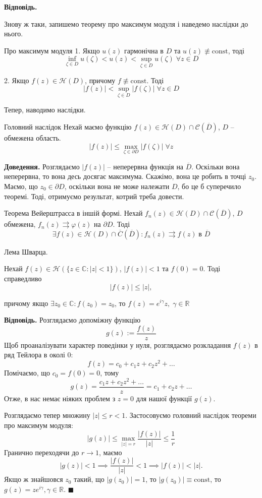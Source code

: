 \documentclass[14pt]{extarticle}
\begin{document}
\textbf{Відповідь.}

Знову ж таки, запишемо теорему про максимум модуля і наведемо наслідки до нього.

\begin{theorem*}{Про максимум модуля}
    1. Якщо $u(z)$ гармонічна в $D$ та $u(z) \not\equiv \text{const}$, тоді
    \[
    \inf_{\zeta \in D} u(\zeta) < u(z) < \sup_{\zeta \in D} u(\zeta) \; \forall z \in D
    \]
    
    2. Якщо $f(z) \in \mathcal{H}(D)$, причому $f \not\equiv \text{const}$. Тоді
    \[
    |f(z)| < \sup_{\zeta \in D}|f(\zeta)| \; \forall z \in D
    \]
\end{theorem*}

Тепер, наводимо наслідки.

\begin{theorem*}{Головний наслідок}
    Нехай маємо функцію $f(z) \in \mathcal{H}(D) \cap \mathcal{C}(\overline{D})$, $D$ -- обмежена область. 
    \[
    |f(z)| \leq \max_{\zeta \in \partial D}|f(\zeta)| \; \forall z
    \]
\end{theorem*}

\textbf{Доведення.} Розглядаємо $|f(z)|$ -- неперервна функція на $\overline{D}$. Оскільки вона неперервна, то вона десь досягає максимума. Скажімо, вона це робить в точці $z_0$. Маємо, що $z_0 \in \partial D$, оскільки вона не може належати $D$, бо це б суперечило теоремі. Тоді, отримуємо результат, котрий треба довести.

\begin{theorem*}{Теорема Вейерштрасса в іншій формі.} 
Нехай $f_n(z) \in \mathcal{H}(D) \cap \mathcal{C}(\overline{D})$, $D$ обмежена, $f_n(z) \rightrightarrows \varphi(z)$ на $\partial D$. Тоді 
\[
\exists f(z) \in \mathcal{H}(D) \cap \overline{C}(\overline{D}): f_n(z) \rightrightarrows f(z) \; \text{в $\overline{D}$}
\]
\end{theorem*}

\begin{lemma*}{Лема Шварца.} 

Нехай $f(z) \in \mathcal{H}(\{z \in \mathbb{C}: |z|<1\})$, $|f(z)| < 1$ та $f(0)=0$. Тоді справедливо
\[
|f(z)| \leq |z|,
\]

причому якщо $\exists z_0 \in \mathbb{C}: f(z_0)=z_0$, то $f(z) =e^{i\gamma}z, \; \gamma \in \mathbb{R}$
\end{lemma*}

\textbf{Відповідь.} Розглядаємо допоміжну функцію
\[
g(z) := \frac{f(z)}{z}
\]
Щоб проаналізувати характер поведінки у нуля, розглядаємо розкладання $f(z)$ в ряд Тейлора в околі $0$:
\[
f(z) = c_0 + c_1 z + c_2z^2 + \dots 
\]
Помічаємо, що $c_0=f(0)=0$, тому
\[
g(z) = \frac{c_1z + c_2z^2+\dots}{z} = c_1+c_2z + \dots 
\]
Отже, в нас немає ніяких проблем з $z=0$ для нашої функції $g(z)$.

Розглядаємо тепер множину $|z| \leq r < 1$. Застосовуємо головний наслідок теореми про максимум модуля:
\[
|g(z)| \leq \max_{|z|=r}\frac{|f(z)|}{|z|} \leq \frac{1}{r}
\]
Гранично переходячи до $r \to 1$, маємо
\[
|g(z)| < 1 \implies \frac{|f(z)|}{|z|} < 1 \implies |f(z)| < |z|.
\]
Якщо ж знайшовся $z_0$ такий, що $|g(z_0)|=1$, то $|g(z_0)|\equiv \text{const}$, то $g(z)=ze^{i\gamma},\gamma \in \mathbb{R}$. $\blacksquare$
\end{document}
